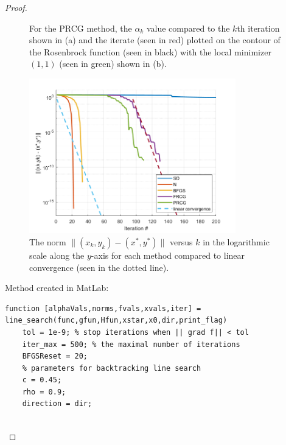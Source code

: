 \documentclass[12pt]{report}
\begin{document}
\begin{problem}
\begin{proof}
\begin{figure}[H]
\begin{subfigure}[b]{0.5\linewidth}
            \caption{}
            \label{fig4-5:b}
            \vspace{4ex}
        \end{subfigure}
        \caption{For the PRCG method, the $\alpha_k$ value compared to the $k$th iteration shown in (a) and the iterate (seen in red) plotted on the contour of the Rosenbrock function (seen in black) with the local minimizer $(1,1)$ (seen in green) shown in (b).}
        \label{fig4-5}
    \end{figure}
    \begin{figure}[H]
        \centering
        \includegraphics[width=0.8\textwidth,height=\textwidth,keepaspectratio]{images/4-norm.png}
        \caption{The norm $\|(x_k,y_k) - (x^*,y^*)\|$ versus $k$ in the logarithmic scale along the $y$-axis for each method compared to linear convergence (seen in the dotted line).}
        \label{fig4-6}
    \end{figure}

Method created in MatLab:
\begin{lstlisting}[style=Matlab-editor]
function [alphaVals,norms,fvals,xvals,iter] = line_search(func,gfun,Hfun,xstar,x0,dir,print_flag)
    tol = 1e-9; % stop iterations when || grad f|| < tol
    iter_max = 500; % the maximal number of iterations
    BFGSReset = 20;
    % parameters for backtracking line search
    c = 0.45;
    rho = 0.9;
    direction = dir;
    

\end{lstlisting}
\end{proof}
\end{problem}
\end{document}
